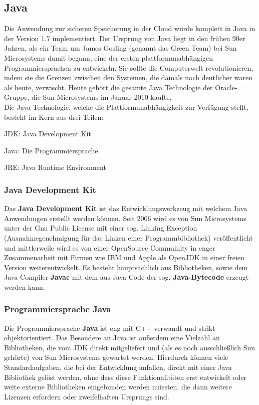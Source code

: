 \documentclass[13pt,a4paper,bibliography=totocnumbered,listof=totocnumbered]{scrartcl}
\begin{document}
\subsection{Java}\label{JavaV}
Die Anwendung zur sicheren Speicherung in der Cloud wurde komplett in Java in der Version 1.7 implementiert. Der Ursprung von Java liegt in den frühen 90er Jahren, als ein Team um James Gosling (genannt das Green Team) bei Sun Microsystems damit begann, eine der ersten plattformunabhängigen Programmiersprachen zu entwickeln. Sie sollte die Computerwelt revolutionieren, indem sie die Grenzen zwischen den Systemen, die damals noch deutlicher waren als heute, verwischt. Heute gehört die gesamte Java Technologie der Oracle-Gruppe, die Sun Microsystems im Januar 2010 kaufte.\\
Die Java Technologie, welche die Plattformunabhängigkeit zur Verfügung stellt, besteht im Kern aus drei Teilen:
\begin{compactitem}
	\item JDK: Java Development Kit
	\item Java: Die Programmiersprache
	\item JRE: Java Runtime Environment
\end{compactitem}

\subsubsection{Java Development Kit}
Das \textbf{Java Development Kit} ist das Entwicklungswerkzeug mit welchem Java Anwendungen erstellt werden können. Seit 2006 wird es von Sun Microsystems unter der Gnu Public License mit einer sog. Linking Exception (Ausnahmegenehmigung für das Linken einer Programmbibliothek) veröffentlicht und mittlerweile wird es von einer OpenSource Commuinity in enger Zusammenarbeit mit Firmen wie IBM und Apple als OpenJDK in einer freien Version weiterentwickelt. Es besteht hauptsächlich aus Bibliotheken, sowie dem Java Compiler \textbf{Javac} mit dem aus Java Code der sog. \textbf{Java-Bytecode} erzeugt werden kann.

\subsubsection{Programmiersprache Java}
Die Programmiersprache \textbf{Java} ist eng mit C++ verwandt und strikt objektorientiert. Das Besondere an Java ist außerdem eine Vielzahl an Bibliotheken, die vom JDK direkt mitgeliefert und (als es noch ausschließlich Sun gehörte) von Sun Microsystems gewartet werden. Hierdurch können viele Standardaufgaben, die bei der Entwicklung anfallen, direkt mit einer Java Bibliothek gelöst werden, ohne dass diese Funktionalitäten erst entwickelt oder weite externe Bibliotheken eingebunden werden müssten, die dann weitere Lizenzen erfordern oder zweifelhaften Ursprungs sind.
\end{document}
